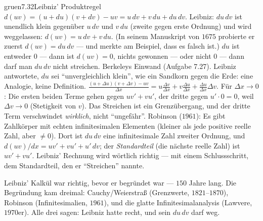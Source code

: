 \begin{loesungkarte}{gruen}{7.32}{Leibniz' Produktregel}
$d(uv) = (u + du)(v + dv) - uv = u\,dv + v\,du + du\,dv$. Leibniz: $du\,dv$ ist unendlich klein gegenüber $u\,dv$ und $v\,du$ (zweite gegen erste Ordnung) und wird weggelassen: $d(uv) = u\,dv + v\,du$. (In seinem Manuskript von $1675$ probierte er zuerst $d(uv) = du\,dv$ --- und merkte am Beispiel, dass es falsch ist.)
$du$ ist entweder $0$ --- dann ist $d(uv) = 0$, nichts gewonnen --- oder nicht $0$ --- dann darf man $du\,dv$ nicht streichen. Berkeleys Einwand (Aufgabe 7.27). Leibniz antwortete, $du$ sei \enquote{unvergleichlich klein}, wie ein Sandkorn gegen die Erde: eine Analogie, keine Definition.
$\frac{(u + \Delta u)(v + \Delta v) - uv}{\Delta x} = u\frac{\Delta v}{\Delta x} + v\frac{\Delta u}{\Delta x} + \frac{\Delta u}{\Delta x}\Delta v$. Für $\Delta x\to0$: Die ersten beiden Terme gehen gegen $uv' + vu'$, der dritte gegen $u'\cdot0 = 0$, weil $\Delta v\to0$ (Stetigkeit von $v$). Das Streichen ist ein Grenzübergang, und der dritte Term verschwindet \emph{wirklich}, nicht \enquote{ungefähr}.
Robinson ($1961$): Es gibt Zahlkörper mit echten infinitesimalen Elementen (kleiner als jede positive reelle Zahl, aber $\neq0$). Dort ist $du\,dv$ eine infinitesimale Zahl zweiter Ordnung, und $d(uv)/dx = uv' + vu' + u'\,dv$; der \emph{Standardteil} (die nächste reelle Zahl) ist $uv' + vu'$. Leibniz' Rechnung wird wörtlich richtig --- mit einem Schlussschritt, dem Standardteil, den er \enquote{Streichen} nannte.
\begin{mitnehmen}\kastentext
Leibniz' Kalkül war richtig, bevor er begründet war --- $150$ Jahre lang. Die Begründung kam dreimal: Cauchy/Weierstraß (Grenzwerte, $1821$--$1870$), Robinson (Infinitesimalien, $1961$), und die glatte Infinitesimalanalysis (Lawvere, $1970$er). Alle drei sagen: Leibniz hatte recht, und sein $du\,dv$ darf weg.
\end{mitnehmen}
\end{loesungkarte}

